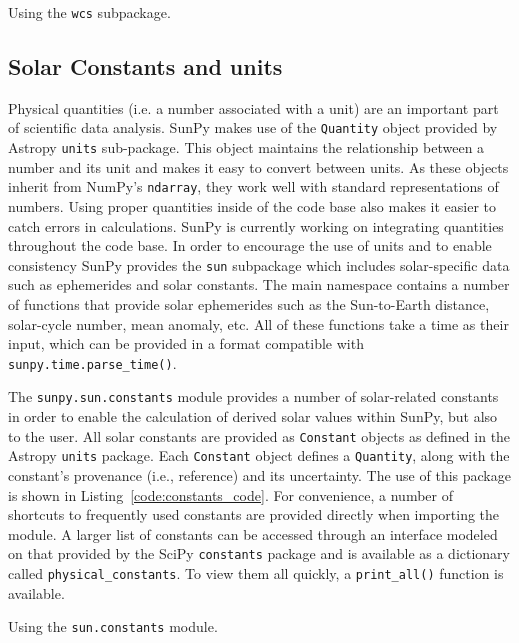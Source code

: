 \begin{listing}[H]
\caption{Using the \texttt{wcs} subpackage.}
\label{code:wcs_code}
\end{listing}

\subsection{Solar Constants and units}\label{ssec:util:sun}
Physical quantities (i.e. a number associated with a unit) are an important part
of scientific data analysis. SunPy makes use of the \texttt{Quantity} object provided by 
Astropy \texttt{units} sub-package. This object maintains the relationship between 
a number and its unit and makes it easy to convert between units. 
As these objects inherit from 
NumPy's \texttt{ndarray}, they work well with standard representations of numbers. Using proper
quantities inside of the code base also makes it easier to catch errors in calculations.
SunPy is currently working on integrating quantities throughout the code base.
In order to encourage the use of units and to enable consistency SunPy provides
the \texttt{sun} subpackage which includes solar-specific data such as ephemerides and
solar constants. The main namespace contains a number of functions that provide solar
ephemerides such as the Sun-to-Earth distance, solar-cycle number, mean 
anomaly, etc.
All of these functions take a time as their input, which can be provided in a format
compatible with \texttt{sunpy.time.parse\_time()}. 

The \texttt{sunpy.sun.constants} module provides a number of solar-related 
constants in order to enable the calculation of derived solar 
values within SunPy, but also to the user. All solar 
constants are provided as \texttt{Constant} objects as defined in the Astropy \texttt{units} package. Each 
\texttt{Constant} object defines a \texttt{Quantity}, along with 
the constant's provenance (i.e., reference) and its uncertainty. The use of this package
is shown in Listing~\ref{code:constants_code}.
For convenience, a number of shortcuts to frequently used constants are provided 
directly when importing the module. A larger list of constants can be 
accessed through an interface modeled on that provided by the SciPy \texttt{constants}
package and is available as a dictionary called \texttt{physical\_constants}. 
To view them all quickly, a \texttt{print\_all()} function is available.

\begin{listing}[H]
\caption{Using the \texttt{sun.constants} module.}
\label{code:constants_code}
\end{listing}
	
